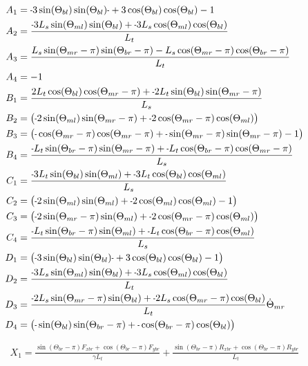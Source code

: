 \documentclass[11pt, landscape]{article}
\newcommand{\mn}{\scalebox{0.7}[1.0]{-}}
\begin{document}
\begin{align}
  A_1 &= \mn 3\sin(\Theta_{bl})\sin(\Theta_{bl})\mn +
  3\cos(\Theta_{bl})\cos(\Theta_{bl}) -1 \\
  A_2 &= \frac{\mn 3L_{s}\sin(\Theta_{ml})\sin(\Theta_{bl}) + \mn 3L_{s}\cos(\Theta_{ml})\cos(\Theta_{bl})}{L_t} \\
  A_3 &= \frac{L_{s}\sin(\Theta_{mr}-\pi)\sin(\Theta_{br}-\pi) - L_{s}\cos(\Theta_{mr}-\pi)\cos(\Theta_{br}-\pi)}{L_{t}} \\
  A_4 &= -1 \\
  B_1 &= \frac{2L_{t}\cos(\Theta_{bl})\cos(\Theta_{mr}-\pi) + \mn 2L_{t}\sin(\Theta_{bl})\sin(\Theta_{mr}-\pi)}{L_{s}} \\
  B_2 &= \big(\mn 2\sin(\Theta_{ml})\sin(\Theta_{mr}-\pi) + \mn 2\cos(\Theta_{mr}-\pi)\cos(\Theta_{ml}) \big) \\
  B_3 &= \big( \mn \cos(\Theta_{mr}-\pi)\cos(\Theta_{mr}-\pi) + \mn\sin(\Theta_{mr}-\pi)\sin(\Theta_{mr}-\pi) - 1\big) \\
  B_4 &= \frac{\mn L_{t}\sin(\Theta_{br}-\pi)\sin(\Theta_{mr}-\pi) + \mn L_{t}\cos(\Theta_{br}-\pi)\cos(\Theta_{mr}-\pi)}{L_{s}} \\
  C_1 &= \frac{\mn 3L_{t}\sin(\Theta_{bl})\sin(\Theta_{ml}) + \mn3L_{t}\cos(\Theta_{bl})\cos(\Theta_{ml})}{L_s} \\
  C_2 &= \big(\mn 2\sin(\Theta_{ml})\sin(\Theta_{ml}) + \mn 2\cos(\Theta_{ml})\cos(\Theta_{ml}) - 1\big) \\
  C_3 &= \big(\mn 2\sin(\Theta_{mr}-\pi)\sin(\Theta_{ml}) + \mn 2\cos(\Theta_{mr}-\pi)\cos(\Theta_{ml}) \big) \\
  C_4 &= \frac{\mn L_{t}\sin(\Theta_{br}-\pi)\sin(\Theta_{ml}) + \mn L_{t}\cos(\Theta_{br}-\pi)\cos(\Theta_{ml})}{L_s} \\
  D_1 &= \big(\mn 3\sin(\Theta_{bl})\sin(\Theta_{bl})\mn + 3\cos(\Theta_{bl})\cos(\Theta_{bl}) -1\big) \\
  D_2 &= \frac{\mn 3L_{s}\sin(\Theta_{ml})\sin(\Theta_{bl}) + \mn 3L_{s}\cos(\Theta_{ml})\cos(\Theta_{bl})}{L_t} \\
  D_3 &= \frac{\mn 2L_{s}\sin(\Theta_{mr}-\pi)\sin(\Theta_{bl}) + \mn 2L_{s}\cos(\Theta_{mr}-\pi)\cos(\Theta_{bl})}{L_t}\dot{\Theta}_{mr} \\
  D_4 &= \big(\mn \sin(\Theta_{bl}) \sin(\Theta_{br}-\pi) + \mn \cos(\Theta_{br}-\pi)\cos(\Theta_{bl})\big) \\
\end{align}

\begin{multline}
  X_1 = \frac{\sin(\Theta_{br}-\pi)F_{xbr} + \cos(\Theta_{br}-\pi)F_{ybr}}{\gamma L_{t}} + \frac{\sin(\Theta_{br}-\pi)R_{xbr} + \cos(\Theta_{br}-\pi)R_{ybr}}{L_{t}} \\
\end{multline}
\end{document}
